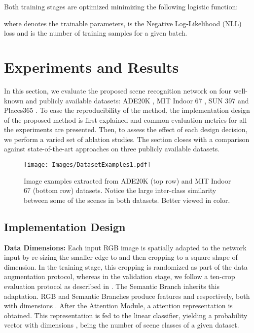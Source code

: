 \documentclass[review, 3p, sort&compress]{elsarticle}
\begin{document}
Both training stages are optimized minimizing the following logistic function:

where  denotes the trainable parameters,  is the Negative Log-Likelihood (NLL) loss and  is the number of training samples for a given batch.

\section{Experiments and Results}\label{sec:Experiments and Results}
In this section, we evaluate the proposed scene recognition network on four well-known and publicly available datasets: ADE20K \cite{zhou2017scene}, MIT Indoor 67 \cite{quattoni2009recognizing}, SUN 397 \cite{xiao2010sun} and Places365 \cite{zhou2018places}. To ease the reproducibility of the method, the implementation design of the proposed method is first explained and common evaluation metrics for all the experiments are presented. Then, to assess the effect of each design decision, we perform a varied set of ablation studies. The section closes with a comparison against state-of-the-art approaches on three publicly available datasets.

\begin{figure*}[t!]
    \centering
    \texttt{[image: Images/DatasetExamples1.pdf]}
    \caption{Image examples extracted from ADE20K \cite{zhou2017scene} (top row) and MIT Indoor 67 \cite{quattoni2009recognizing} (bottom row) datasets. Notice the large inter-class similarity between some of the scenes in both datasets. Better viewed in color.}
    \label{fig:DatasetExamples1}
\end{figure*}

\subsection{Implementation Design}\label{Implementation Details}
\textbf{Data Dimensions:} Each input RGB image  is spatially adapted to the network input by re-sizing the smaller edge to  and then cropping to a square shape of  dimension. In the training stage, this cropping is randomized as part of the data augmentation protocol, whereas in the validation stage, we follow a ten-crop evaluation protocol as described in \cite{zhou2018places}. The Semantic Branch inherits this adaptation. RGB and Semantic Branches produce features  and  respectively, both with dimensions . After the Attention Module, a  attention representation  is obtained. This representation is fed to the linear classifier, yielding a probability vector  with dimensions , being  the number of scene classes of a given dataset.
\end{document}
